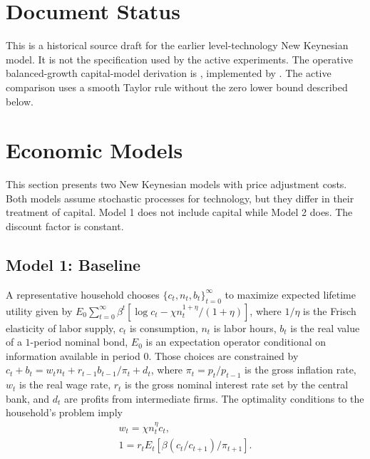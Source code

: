 \documentclass[12pt,final]{article}
\begin{document}
\section*{Document Status}
This is a historical source draft for the earlier level-technology New
Keynesian model. It is not the specification used by the active experiments.
The operative balanced-growth capital-model derivation is
, implemented by
. The active comparison uses a smooth
Taylor rule without the zero lower bound described below.

\section{Economic Models} \label{sec:models}

This section presents two New Keynesian models with \citet{Rotemberg1982} price adjustment costs. Both models assume stochastic processes for technology, but they differ in their treatment of capital. Model 1 does not include capital while Model 2 does. The discount factor is constant.

\subsection{Model 1: Baseline}\label{sec:model1}

A representative household chooses $\{c_t,n_t,b_t\}_{t=0}^\infty$ to maximize expected lifetime utility given by $E_0\sum_{t=0}^\infty\beta^{t}[\log c_t-\chi n_t^{1+\eta}/(1+\eta)]$, where $1/\eta$ is the Frisch elasticity of labor supply, $c_t$ is consumption, $n_t$ is labor hours, $b_t$ is the real value of a $1$-period nominal bond, $E_0$ is an expectation operator conditional on information available in period $0$. Those choices are constrained by $c_t+b_t=w_tn_t+r_{t-1}b_{t-1}/\pi_t+d_t$, where $\pi_t=p_t/p_{t-1}$ is the gross inflation rate, $w_t$ is the real wage rate, $r_t$ is the gross nominal interest rate set by the central bank, and $d_t$ are profits from intermediate firms. The optimality conditions to the household's problem imply
\begin{gather}
  w_t=\chi n_t^\eta c_t,  \label{FOC labor} \\
  1= r_tE_t[\beta (c_t/c_{t+1})/\pi_{t+1}]. \label{bond euler1}
\end{gather}
\end{document}
